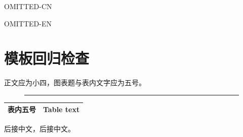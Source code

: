 \documentclass[no-frontmatter]{neudissertation}
\begin{document}
\makeneucovers
\frontmatter
\makeneudeclaration
\begin{abstractcn}OMITTED-CN\end{abstractcn}
\begin{abstracten}OMITTED-EN\end{abstracten}
\tableofcontents
\mainmatter
\chapter{模板回归检查}
正文应为小四，图表题与表内文字应为五号。
\begin{figure}[H]
\centering\rule{30mm}{10mm}
\end{figure}
\begin{table}[H]
\centering\begin{tabular}{ll}\hline
表内五号 & Table text\\\hline
\end{tabular}
\end{table}
后接中文，后接中文。
\end{document}
